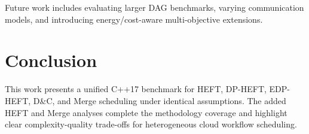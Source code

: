 \documentclass[conference]{IEEEtran}
\begin{document}
Future work includes evaluating larger DAG benchmarks, varying
communication models, and introducing energy/cost-aware multi-objective
extensions.

\section{Conclusion}
\label{sec:conclusion}

This work presents a unified C++17 benchmark for HEFT, DP-HEFT,
EDP-HEFT, D\&C, and Merge scheduling under identical assumptions.
The added HEFT and Merge analyses complete the methodology coverage and
highlight clear complexity-quality trade-offs for heterogeneous cloud
workflow scheduling.

\balance


\end{document}
